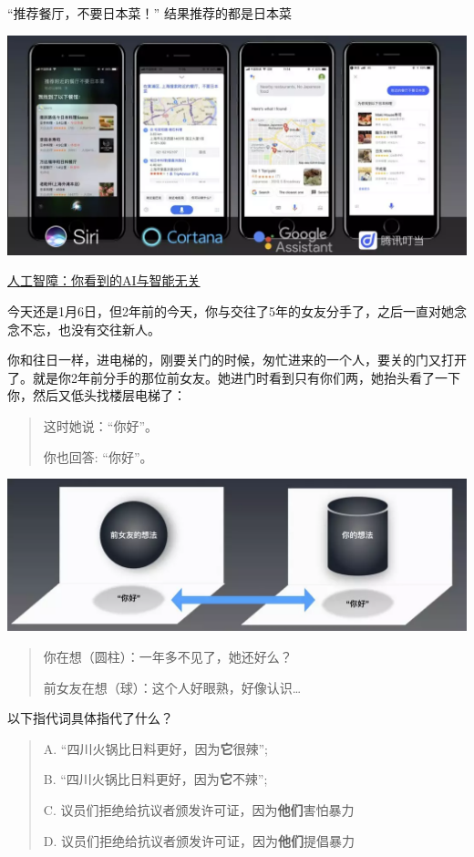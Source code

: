 \documentclass[11pt]{article}
\makeatletter
\def\maxwidth{\ifdim\Gin@nat@width>\linewidth\linewidth
    \else\Gin@nat@width\fi}
\let\Oldincludegraphics\includegraphics
\renewcommand{\includegraphics}[1]{\Oldincludegraphics[width=.8\maxwidth]{#1}}
\makeatother
\begin{document}
    ``推荐餐厅，不要日本菜！'' 结果推荐的都是日本菜

\includegraphics{img/ai_test.png}

    \href{https://mp.weixin.qq.com/s/tFcVohNjdhvBE_INQk9muQ}{人工智障：你看到的AI与智能无关}

今天还是1月6日，但2年前的今天，你与交往了5年的女友分手了，之后一直对她念念不忘，也没有交往新人。

你和往日一样，进电梯的，刚要关门的时候，匆忙进来的一个人，要关的门又打开了。就是你2年前分手的那位前女友。她进门时看到只有你们两，她抬头看了一下你，然后又低头找楼层电梯了：

\begin{quote}
这时她说：``你好''。

你也回答: ``你好''。
\end{quote}

    \includegraphics{img/mind.png}

\begin{quote}
你在想（圆柱）：一年多不见了，她还好么？

前女友在想（球）：这个人好眼熟，好像认识\ldots{}
\end{quote}

    以下指代词具体指代了什么？

\begin{quote}
A. ``四川火锅比日料更好，因为\textbf{它}很辣'';

B. ``四川火锅比日料更好，因为\textbf{它}不辣'';

C. 议员们拒绝给抗议者颁发许可证，因为\textbf{他们}害怕暴力

D. 议员们拒绝给抗议者颁发许可证，因为\textbf{他们}提倡暴力
\end{quote}
\end{document}
